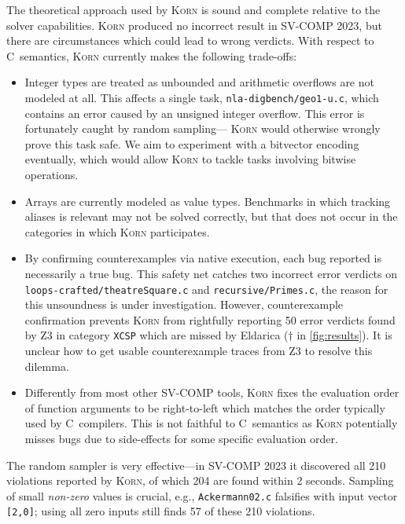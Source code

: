 \documentclass{llncs}
\newcommand{\Korn}{\textsc{Korn}\xspace}
\begin{document}
The theoretical approach used by \Korn is sound and complete
relative to the solver capabilities.
\Korn produced no incorrect result in SV-COMP 2023,
but there are circumstances which could lead to wrong verdicts.
With respect to C~semantics, \Korn currently makes the following trade-offs:
\begin{itemize}
\item Integer types are treated as unbounded and arithmetic overflows are not modeled at all.
 This affects a single task, \texttt{nla-digbench/geo1-u.c},
 which contains an error caused by an unsigned integer overflow.
 This error is fortunately caught by random sampling---
 \Korn would otherwise wrongly prove this task safe.
 We aim to experiment with a bitvector encoding eventually,
 which would allow \Korn to tackle tasks involving bitwise operations.
\item Arrays are currently modeled as value types.
 Benchmarks in which tracking aliases is relevant
 may not be solved correctly, but that does not occur in the categories in which \Korn participates.
\item By confirming counterexamples via native execution,
 each bug reported is necessarily a true bug.
 This safety net catches two incorrect error verdicts
 on
 \texttt{loops-crafted/theatreSquare.c} and \texttt{recursive/Primes.c},
 the reason for this unsoundness is under investigation.
 However, counterexample confirmation prevents \Korn from rightfully reporting 50 error verdicts found by Z3 in category \texttt{XCSP}
 which are missed by Eldarica ($\dagger$ in \cref{fig:results}).
 It is unclear how to get usable counterexample traces from Z3 to resolve this dilemma.
\item
 Differently from most other SV-COMP tools, \Korn fixes the evaluation order of function arguments to be right-to-left
 which matches the order typically used by C~compilers.
 This is not faithful to C~semantics as \Korn potentially misses bugs due to side-effects
 for some specific evaluation order.
\end{itemize}

The random sampler is very effective---in SV-COMP 2023 it discovered
all 210 violations reported by \Korn, of which 204 are found within 2 seconds.
Sampling of small \emph{non-zero} values is crucial, e.g., \texttt{Ackermann02.c}
falsifies with input vector \texttt{[2,0]};
using all zero inputs still finds 57 of these 210 violations.
\end{document}
